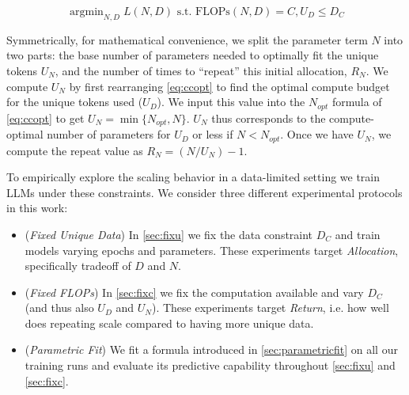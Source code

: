 \documentclass{article}
\DeclareMathOperator*{\argmin}{argmin}
\begin{document}
\begin{equation}\label{eq:modeldc}
    \argmin_{N, D} L(N, D) \text{ s.t. } \text{FLOPs}(N, D) = C, U_D \le D_C
\end{equation}

Symmetrically, for mathematical convenience, we split the parameter term $N$ into two parts: the base number of parameters needed to optimally fit the unique tokens $U_N$, and the number of times to ``repeat'' this initial allocation, $R_N$. We compute $U_N$ by first rearranging \autoref{eq:ccopt} to find the optimal compute budget for the unique tokens used ($U_D$). We input this value into the $N_{opt}$ formula of \autoref{eq:ccopt} to get $U_N= \min \{ N_{opt}, N\}$. $U_N$ thus corresponds to the compute-optimal number of parameters for $U_D$ or less if $N < N_{opt}$. Once we have $U_N$, we compute the repeat value as $R_N = (N/U_N)-1$.


To empirically explore the scaling behavior in a data-limited setting we train LLMs under these constraints. We consider three different experimental protocols in this work:

\begin{itemize}
    \item (\textit{Fixed Unique Data}) In \autoref{sec:fixu} we fix the data constraint $D_C$ and train models varying epochs and parameters. These experiments target \textit{Allocation}, specifically tradeoff of $D$ and $N$. 
    \item (\textit{Fixed FLOPs}) In \autoref{sec:fixc} we fix the computation available and vary $D_C$ (and thus also $U_D$ and $U_N$). These experiments target \textit{Return}, i.e. how well does repeating scale compared to having more unique data. 
    \item  (\textit{Parametric Fit}) We fit a formula introduced in \autoref{sec:parametricfit} on all our training runs and evaluate its predictive capability throughout \autoref{sec:fixu} and \autoref{sec:fixc}.
\end{itemize}
\end{document}
